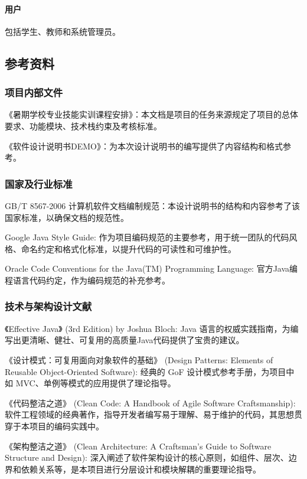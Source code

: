 \paragraph{用户}包括学生、教师和系统管理员。

\subsection{参考资料}
\subsubsection{项目内部文件}

《暑期学校专业技能实训课程安排》：本文档是项目的任务来源规定了项目的总体要求、功能模块、技术栈约束及考核标准。

《软件设计说明书DEMO》：为本次设计说明书的编写提供了内容结构和格式参考。

\subsubsection{国家及行业标准}

GB/T 8567-2006 计算机软件文档编制规范：本设计说明书的结构和内容参考了该国家标准，以确保文档的规范性。

Google Java Style Guide: 作为项目编码规范的主要参考，用于统一团队的代码风格、命名约定和格式化标准，以提升代码的可读性和可维护性。

Oracle Code Conventions for the Java(TM) Programming Language: 官方Java编程语言代码约定，作为编码规范的补充参考。

\subsubsection{技术与架构设计文献}

《Effective Java》 (3rd Edition) by Joshua Bloch: Java 语言的权威实践指南，为编写出更清晰、健壮、可复用的高质量Java代码提供了宝贵的建议。

《设计模式：可复用面向对象软件的基础》 (Design Patterns: Elements of Reusable Object-Oriented Software): 经典的 GoF 设计模式参考手册，为项目中如 MVC、单例等模式的应用提供了理论指导。

《代码整洁之道》 (Clean Code: A Handbook of Agile Software Craftsmanship): 软件工程领域的经典著作，指导开发者编写易于理解、易于维护的代码，其思想贯穿于本项目的编码实践中。

《架构整洁之道》 (Clean Architecture: A Craftsman's Guide to Software Structure and Design): 深入阐述了软件架构设计的核心原则，如组件、层次、边界和依赖关系等，是本项目进行分层设计和模块解耦的重要理论指导。
